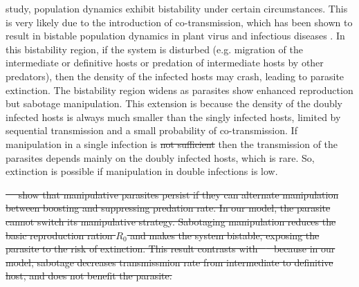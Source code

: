 \documentclass[a4paper]{scrartcl}
\providecommand{\DIFaddtex}[1]{{\protect\color{blue}\uwave{#1}}} %
\providecommand{\DIFdeltex}[1]{{\protect\color{red}\sout{#1}}}                      %
\providecommand{\DIFaddbegin}{} %
\providecommand{\DIFaddend}{} %
\providecommand{\DIFdelbegin}{} %
\providecommand{\DIFdelend}{} %
\providecommand{\DIFadd}[1]{\texorpdfstring{\DIFaddtex{#1}}{#1}} %
\providecommand{\DIFdel}[1]{\texorpdfstring{\DIFdeltex{#1}}{}} %
\newcommand{\DIFscaledelfig}{0.5}
\newlength{\DIFdelgraphicswidth} %
\newlength{\DIFdelgraphicsheight} %
\newcommand{\DIFaddincludegraphics}[2][]{{\color{blue}\fbox{\DIFOincludegraphics[#1]{#2}}}} %
\newcommand{\DIFdelincludegraphics}[2][]{%
\sbox{\DIFdelgraphicsbox}{\DIFOincludegraphics[#1]{#2}}%
\settoboxwidth{\DIFdelgraphicswidth}{\DIFdelgraphicsbox} %
\settoboxtotalheight{\DIFdelgraphicsheight}{\DIFdelgraphicsbox} %
\scalebox{\DIFscaledelfig}{%
\parbox[b]{\DIFdelgraphicswidth}{\usebox{\DIFdelgraphicsbox}\\[-\baselineskip] \rule{\DIFdelgraphicswidth}{0em}}\llap{\resizebox{\DIFdelgraphicswidth}{\DIFdelgraphicsheight}{%
\setlength{\unitlength}{\DIFdelgraphicswidth}%
\begin{picture}(1,1)%
\thicklines\linethickness{2pt} %
{\color[rgb]{1,0,0}\put(0,0){\framebox(1,1){}}}%
{\color[rgb]{1,0,0}\put(0,0){\line( 1,1){1}}}%
{\color[rgb]{1,0,0}\put(0,1){\line(1,-1){1}}}%
\end{picture}%
}\hspace*{3pt}}} %
} %
\DeclareRobustCommand{\DIFaddbegin}{\DIFOaddbegin \let\includegraphics\DIFaddincludegraphics} %
\DeclareRobustCommand{\DIFaddend}{\DIFOaddend \let\includegraphics\DIFOincludegraphics} %
\DeclareRobustCommand{\DIFdelbegin}{\DIFOdelbegin \let\includegraphics\DIFdelincludegraphics} %
\DeclareRobustCommand{\DIFdelend}{\DIFOaddend \let\includegraphics\DIFOincludegraphics} %
\begin{document}
\DIFadd{In our }\DIFaddend study, population dynamics exhibit bistability under certain circumstances. 
This is very likely due to the introduction of co-transmission, which has been shown to result in bistable population dynamics in plant virus \cite{allen_modelling_2019} and infectious diseases \cite{gao_coinfection_2016-1}.
 In this bistability region, if the system is disturbed (e.g. migration of the intermediate or definitive hosts or predation of intermediate hosts by other predators), then the density of the infected hosts may crash, leading to parasite extinction. 
The bistability region widens as parasites show enhanced reproduction but sabotage manipulation. 
This extension is because the density of the doubly infected hosts is always much smaller than the singly infected hosts, limited by sequential transmission and a small probability of co-transmission. 
If manipulation in a single infection is \DIFdelbegin \DIFdel{not sufficient }\DIFdelend \DIFaddbegin \DIFadd{insufficient, }\DIFaddend then the transmission of the parasites depends mainly on the doubly infected hosts, which is rare. 
So, extinction is possible if manipulation in double infections is low.

\DIFdelbegin \DIFdel{\mbox{%
\cite{Iritani2018} }\hskip0pt%
show that manipulative parasites persist if they can alternate manipulation between boosting and suppressing predation rate. 
In our model, the parasite cannot switch its manipulative strategy. 
Sabotaging manipulation reduces the basic reproduction ration $R_0$ and makes the system bistable, exposing the parasite to the risk of extinction. This result contrasts with \mbox{%
\cite{Iritani2018} }\hskip0pt%
because in our model, sabotage decreases transmissmion rate from intermediate to definitive host, and does not benefit the parasite.
}%
\end{document}
